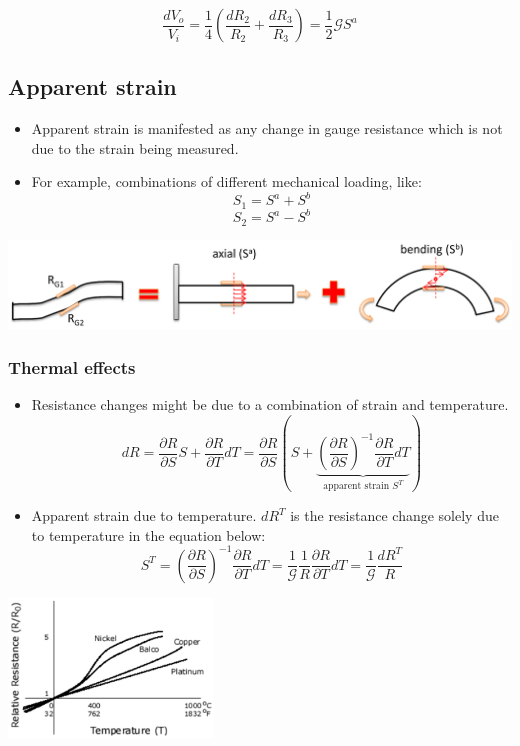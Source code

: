 \documentclass[11pt]{article}
\begin{document}
\[\frac{dV_o}{V_i} = \frac{1}{4} \left(\frac{dR_2}{R_2} + \frac{dR_3}{R_3} \right) = \frac{1}{2} \mathcal{G} S^a\]

 \newpage
\subsection{Apparent strain}
\label{sec:org08bdfc4}
\begin{itemize}
\item Apparent strain is manifested as any change in gauge resistance which is not due to the strain being measured.
\item For example, combinations of different mechanical loading, like:
\[S_1 = S^a + S^b\]
\[S_2 = S^a - S^b\]
\end{itemize}

\begin{center}
\includegraphics[width=.9\linewidth]{./images/apparent-strain-loading-condition-diagram.png}
\end{center}
\subsubsection{Thermal effects}
\label{sec:orgdcf3475}
\begin{itemize}
\item Resistance changes might be due to a combination of strain and temperature.
\[dR = \frac{\partial R}{\partial S} S + \frac{\partial R}{\partial T} dT = \frac{\partial R}{\partial S} \left(S + \underbrace{\left(\frac{\partial R}{\partial S} \right)^{-1} \frac{\partial R}{\partial T} dT}_{\text{apparent strain } S^T} \right)\]
\item Apparent strain due to temperature. \(dR^T\) is the resistance change solely due to temperature in the equation below:
\[S^T = \left(\frac{\partial R}{\partial S} \right)^{-1} \frac{\partial R}{\partial T} dT = \frac{1}{\mathcal{G}} \frac{1}{R} \frac{\partial R}{\partial T} dT = \frac{1}{\mathcal{G}} \frac{dR^T}{R}\]
\end{itemize}

\begin{center}
\includegraphics[height=10em]{./images/apparent-strain-thermal-effects-graph.png}
\end{center}
\end{document}
